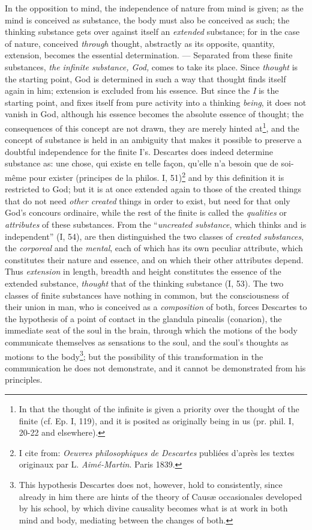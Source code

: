 \documentclass[12pt,a4paper,openany]{book}
\newcommand{\opage}[1]{\marginnote{\footnotesize\textit{[#1]}}}
\begin{document}
In the opposition to mind, the independence of nature from mind is
given; as the mind is conceived as substance, the body must also be
conceived as such; the thinking substance gets over against itself an
\emph{extended} substance; for in the case of nature, conceived \emph{through}
thought, abstractly as its opposite, quantity, extension, becomes the
essential determination. --- Separated from these finite substances,
\emph{the infinite substance, God,} comes to take its place. Since
\emph{thought} is the starting point, God is determined in such a way
that thought finds itself again in him; extension is excluded from his
essence. But since the \emph{I} is the starting point, and fixes itself
from pure activity into a thinking \emph{being}, it does not vanish in
God, although his essence
\opage{20}\setcounter{footnote}{0}becomes the absolute essence of thought;
the consequences of this concept are not drawn, they are merely hinted
at\footnote{In that the thought of the infinite is given a priority
over the thought of the finite (cf. Ep. I, 119), and it is posited as
originally being in us (pr. phil. I, 20-22 and elsewhere).}, and the
concept of substance is held in an ambiguity that makes it possible to
preserve a doubtful independence for the finite I's. Descartes does
indeed determine substance as: une chose, qui existe en telle façon,
qu'elle n'a besoin que de soi-même pour exister (principes de la philos.
I, 51)\footnote{I cite from: \emph{Oeuvres philosophiques de Descartes}
publiées d'après les textes originaux par L. \emph{Aimé-Martin}. Paris
1839.} and by this definition it is restricted to God; but it is at once
extended again to those of the created things that do not need
\emph{other created} things in order to exist, but need for that only
God's concours ordinaire, while the rest of the finite is called the
\emph{qualities} or \emph{attributes} of these substances. From the
``\emph{uncreated substance}, which thinks and is independent'' (I, 54),
are then distinguished the two classes of \emph{created substances}, the
\emph{corporeal} and the \emph{mental}, each of which has its own
peculiar attribute, which constitutes their nature and essence, and on
which their other attributes depend. Thus \emph{extension} in length,
breadth and height constitutes the essence of the extended substance,
\emph{thought} that of the thinking substance (I, 53). The two classes
of finite substances have nothing in common, but the consciousness of
their union in man, who is conceived as a \emph{composition} of both,
forces Descartes to the hypothesis of a point of contact in the glandula
pinealis (conarion), the immediate seat of the soul in the brain,
through which the motions of the body communicate themselves as
sensations to the soul, and the soul's thoughts as motions to the
body\footnote{This hypothesis Descartes does not, however, hold to
consistently, since already in him there are hints of the theory of
Causæ occasionales developed by his school, by which divine causality
becomes what is at work in both mind and body, mediating between the
changes of both.}; but the possibility of this
\opage{21}transformation in the communication he does not demonstrate, and
it cannot be demonstrated from his principles.
\end{document}

